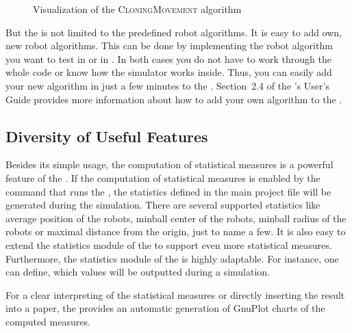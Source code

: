 \begin{figure}[ht]
\begin{minipage}[t]{0.46\textwidth}
		\caption{Visualization of the \textsc{CloningMovement} algorithm}
		\label{WII:fig:cloning-movement}
	\end{minipage}
\end{figure}

But the \RSS is not limited to the predefined robot algorithms. It is easy to add own, new robot algorithms. This can be done by implementing the robot algorithm you want to test in \Cpp or in \Lua. 
In both cases you do not have to work through the whole code or know how the simulator works inside. Thus, you can easily add your new algorithm in just a few minutes to the \RSS.
Section~2.4 of the \RSS's User's Guide provides more information about how to add your own algorithm to the \RSS.

\subsection{Diversity of Useful Features}\label{WII:sec:features}
Besides its simple usage, the computation of statistical measures is a powerful feature of the \RSS. 
If the computation of statistical measures is enabled by the command that runs the \RSS, the statistics defined in the main project file will be generated during the simulation.
There are several supported statistics like average position of the robots, minball center of the robots, minball radius of the robots or maximal distance from the origin, just to name a few. It is also easy to extend the statistics module of the \RSS to support even more statistical measures.
Furthermore, the statistics module of the \RSS is highly adaptable. For instance, one can define, which values will be outputted during a simulation.
\par
For a clear interpreting of the statistical measures or directly inserting the result into a paper, the \RSS provides an automatic generation of GnuPlot charts of the computed measures.\medskip

